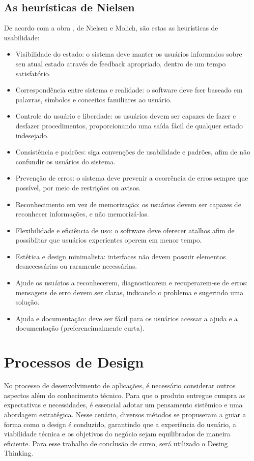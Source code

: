 \subsection{As heurísticas de Nielsen}

De acordo com a obra \cite{nielsen1994usability}, de Nielsen e Molich, são estas as heurísticas de usabilidade:

\begin{itemize}
    \item Visibilidade do estado: o sistema deve manter os usuários informados sobre seu atual estado através de feedback apropriado, dentro de um tempo satisfatório.
    \item Correspondência entre sistema e realidade: o software deve fser baseado em palavras, símbolos e conceitos familiares ao usuário.
    \item Controle do usuário e liberdade: os usuários devem ser capazes de fazer e desfazer procedimentos, proporcionando uma saída fácil de qualquer estado indesejado.
    \item Consistência e padrões: siga convenções de usabilidade e padrões, afim de não confundir os usuários do sistema.
    \item Prevenção de erros: o sistema deve prevenir a ocorrência de erros sempre que possível, por meio de restrições ou avisos.
    \item Reconhecimento em vez de memorização: os usuários devem ser capazes de reconhecer informações, e não memorizá-las.
    \item Flexibilidade e eficiência de uso: o software deve oferecer atalhos  afim de possiblitar que usuários experientes operem em menor tempo.
    \item Estética e design minimalista: interfaces não devem possuir elementos desnecessárias ou raramente necessárias.
    \item Ajude os usuários a reconhecerem, diagnosticarem e recuperarem-se de erros: mensagens de erro devem ser claras, indicando o problema e sugerindo uma solução.
    \item Ajuda e documentação: deve ser fácil para os usuários acessar a ajuda e a documentação (preferencimalmente curta).
\end{itemize}

\section{Processos de Design}

No processo de desenvolvimento de aplicações, é necessário considerar outros aspectos além do conhecimento técnico. Para que o produto entregue cumpra as expectativas e necessidades, é essencial adotar um pensamento sistêmico e uma abordagem estratégica. Nesse cenário, diversos métodos se propuseram a guiar a forma como o design é conduzido, garantindo que a experiência do usuário, a viabilidade técnica e os objetivos do negócio sejam equilibrados de maneira eficiente. Para esse trabalho de conclusão de curso, será utilizado o Desing Thinking.



